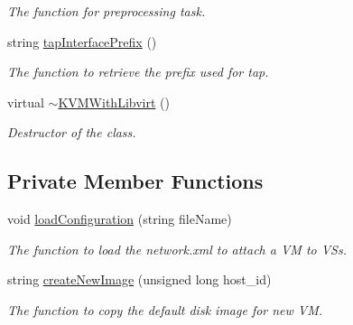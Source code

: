 \begin{DoxyCompactItemize}
\begin{DoxyCompactList}\small\item\em \-The function for preprocessing task. \end{DoxyCompactList}\item 
string \hyperlink{classKVMWithLibvirt_a72b1ccc74e4795ee4f4375da3a551e70}{tap\-Interface\-Prefix} ()
\begin{DoxyCompactList}\small\item\em \-The function to retrieve the prefix used for tap. \end{DoxyCompactList}\item 
\hypertarget{classKVMWithLibvirt_a6deab5d821db1b50e6ae3111082ddce3}{virtual \hyperlink{classKVMWithLibvirt_a6deab5d821db1b50e6ae3111082ddce3}{$\sim$\-K\-V\-M\-With\-Libvirt} ()}\label{classKVMWithLibvirt_a6deab5d821db1b50e6ae3111082ddce3}

\begin{DoxyCompactList}\small\item\em \-Destructor of the class. \end{DoxyCompactList}\end{DoxyCompactItemize}
\subsection*{\-Private \-Member \-Functions}
\begin{DoxyCompactItemize}
\item 
\hypertarget{classKVMWithLibvirt_a9bf3eed10d4db0b96d84e178512ae867}{void \hyperlink{classKVMWithLibvirt_a9bf3eed10d4db0b96d84e178512ae867}{load\-Configuration} (string file\-Name)}\label{classKVMWithLibvirt_a9bf3eed10d4db0b96d84e178512ae867}

\begin{DoxyCompactList}\small\item\em \-The function to load the network.\-xml to attach a \-V\-M to \-V\-Ss. \end{DoxyCompactList}\item 
string \hyperlink{classKVMWithLibvirt_abb5003678efe02ddaf9daef164755e42}{create\-New\-Image} (unsigned long host\-\_\-id)
\begin{DoxyCompactList}\small\item\em \-The function to copy the default disk image for new \-V\-M. \end{DoxyCompactList}\end{DoxyCompactItemize}
